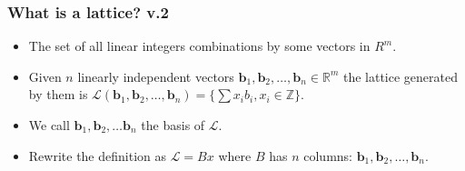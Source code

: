 \documentclass{beamer}
\begin{document}
% 
\begin{frame}
    \frametitle{What is a lattice? v.2}
    \begin{itemize}
        \item The set of all linear integers combinations by some vectors in $R^m$.
        \pause \item Given $n$ linearly independent vectors $\mathbf{b}_1, \mathbf{b}_2, \dots, \mathbf{b}_n \in \mathbb{R}^m$ the lattice generated by them is $\mathcal{L}(\mathbf{b}_1, \mathbf{b}_2, \dots, \mathbf{b}_n) = \{ \sum\nolimits{}{x_ib_i} , x_i \in \mathbb{Z}\}$.
        \pause \item We call $\mathbf{b}_1, \mathbf{b}_2, \dots \mathbf{b}_n$ the basis of $\mathcal{L}$.
        \pause \item Rewrite the definition as $\mathcal{L} = Bx$ where $B$ has $n$ columns: $\mathbf{b}_1, \mathbf{b}_2, \dots, \mathbf{b}_n$.

    \end{itemize}
\end{frame}

\end{document}
